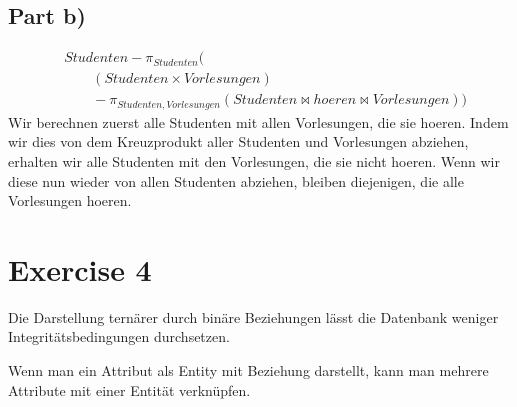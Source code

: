 \documentclass[10pt,a4paper]{article}
\begin{document}
\subsection*{Part b)}

\begin{align*}
  & Studenten - \pi_{Studenten}(\\
  & \qquad (Studenten \times Vorlesungen)\\
  & \qquad - \pi_{Studenten, Vorlesungen}(Studenten \bowtie hoeren \bowtie Vorlesungen))
\end{align*}
Wir berechnen zuerst alle Studenten mit allen Vorlesungen, die sie hoeren.
Indem wir dies von dem Kreuzprodukt aller Studenten und Vorlesungen abziehen, erhalten wir alle Studenten mit den Vorlesungen, die sie nicht hoeren.
Wenn wir diese nun wieder von allen Studenten abziehen, bleiben diejenigen, die alle Vorlesungen hoeren.

\section*{Exercise 4}

Die Darstellung ternärer durch binäre Beziehungen lässt die Datenbank weniger Integritätsbedingungen durchsetzen.

Wenn man ein Attribut als Entity mit Beziehung darstellt, kann man mehrere Attribute mit einer Entität verknüpfen.
\end{document}
